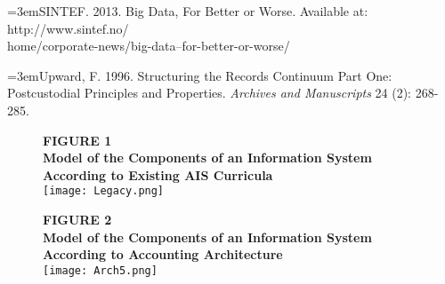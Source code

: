 \documentclass[12pt]{article}
\newcommand{\Reference}[1]{\parindent=0pt\hangindent=3em\hangafter=1#1\vspace{.15in}}
\begin{document}
\Reference{SINTEF. 2013. Big Data, For Better or Worse. Available at: http://www.sintef.no/\\home/corporate-news/big-data--for-better-or-worse/}

\Reference{Upward, F. 1996. Structuring the Records Continuum Part One: Postcustodial Principles and Properties. \emph{Archives and Manuscripts} 24 (2): 268-285.}

\newpage{}

\begin{figure}[!h]
\begin{center}
\textbf{\MakeUppercase{Figure 1}}\\[.2in]
\textbf{Model of the Components of an Information System According to Existing AIS Curricula}\\[.4in]
\texttt{[image: Legacy.png]}
\end{center}
\end{figure}
\newpage{}

\begin{figure}[!h]
\begin{center}
\textbf{\MakeUppercase{Figure 2}}\\[.2in]
\textbf{Model of the Components of an Information System According to Accounting Architecture}\\[.4in]
\texttt{[image: Arch5.png]}
\end{center}
\end{figure}
\end{document}
